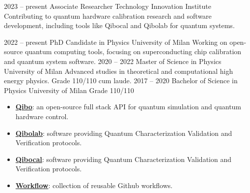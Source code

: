 \documentclass[9pt]{developercv} %
\begin{document}



\begin{entrylist}
	\entry
		{2023 -- present}
		{Associate Researcher}
		{Technology Innovation Institute}
		{Contributing to quantum hardware calibration research and software development, 
        including tools like Qibocal and Qibolab for quantum systems.}
\end{entrylist}



\begin{entrylist}
	\entry
		{2022 -- present}
		{PhD Candidate in Physics}
		{University of Milan}
		{Working on open-source quantum computing tools, focusing on superconducting
        chip calibration and quantum system software.}
	\entry
		{2020 -- 2022}
		{Master of Science in Physics}
		{University of Milan}
        {Advanced studies in theoretical and computational high energy physics.
        Grade 110/110 cum laude.}
	\entry
		{2017 -- 2020}
		{Bachelor of Science in Physics}
		{University of Milan}
		{Grade 110/110}
\end{entrylist}

\begin{itemize}[topsep=0pt]
    \addtolength{\itemindent}{65px}
    \setlength\itemsep{1px}
    \item[\faGithub] \href{https://github.com/qiboteam/qibo}{\textbf{Qibo}}:
         an open-source full stack API for quantum simulation and quantum hardware control.
    \item[\faGithub] \href{https://github.com/qiboteam/qibolab}{\textbf{Qibolab}}:
        software providing Quantum Characterization Validation and Verification protocols. 
    \item[\faGithub] \href{https://github.com/qiboteam/qibocal}{\textbf{Qibocal}}:
        software providing Quantum Characterization Validation and Verification protocols. 
    \item[\faGithub] \href{https://github.com/qiboteam/workflows}{\textbf{Workflow}}:
        collection of reusable Github workflows.
\end{itemize}
\end{document}
